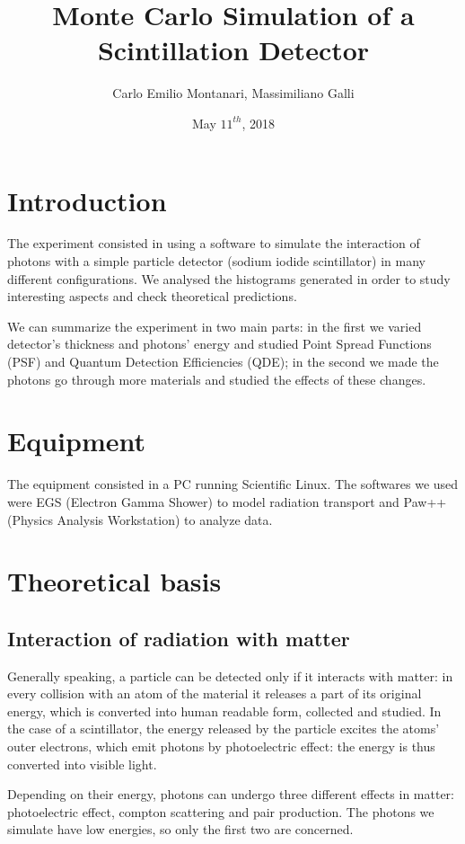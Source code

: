 \documentclass[a4paper]{article}
\begin{document}
\title{Monte Carlo Simulation of a Scintillation Detector}
\author{Carlo Emilio Montanari, Massimiliano Galli}
\date{May $11^{th}$, 2018}
\maketitle

\section{Introduction}
The experiment consisted in using a software to simulate the interaction of photons with a simple particle detector (sodium iodide scintillator) in many different configurations. We analysed the histograms generated in order to study interesting aspects and check theoretical predictions.

We can summarize the experiment in two main parts: in the first we varied detector's thickness and photons' energy and studied Point Spread Functions (PSF) and Quantum Detection Efficiencies (QDE); in the second we made the photons go through more materials and studied the effects of these changes.

\section{Equipment}
The equipment consisted in a PC running Scientific Linux. The softwares we used were EGS (Electron Gamma Shower) to model radiation transport and Paw++ (Physics Analysis Workstation) to analyze data.

\section{Theoretical basis}
\subsection{Interaction of radiation with matter}
Generally speaking, a particle can be detected only if it interacts with matter: in every collision with an atom of the material it releases a part of its original energy, which is converted into human readable form, collected and studied. In the case of a scintillator, the energy released by the particle excites the atoms' outer electrons, which emit photons by photoelectric effect: the energy is thus converted into visible light.

Depending on their energy, photons can undergo three different effects in matter: photoelectric effect, compton scattering and pair production. The photons we simulate have low energies, so only the first two are concerned.
\end{document}
